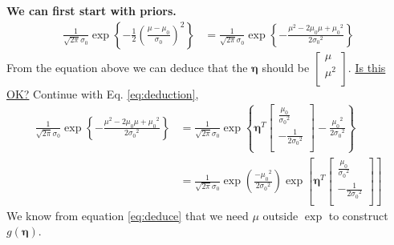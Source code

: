 \documentclass[12pt]{article}
\begin{document}
\textbf{We can first start with priors.}
\begin{equation}\label{eq:deduction}
    \begin{split}
        \frac{1}{\sqrt{2 \pi} \sigma_{0}} \exp \left\{-\frac{1}{2}\left(\frac{\mu-\mu_{0}}{\sigma_{0}}\right)^{2}\right\}&=\frac{1}{\sqrt{2 \pi} \sigma_{0}}\exp \left\{-\frac{\mu^2-2{\mu}_0\mu+{\mu_0}^2}{2{\sigma_0}^2}\right\}
    \end{split}
\end{equation}
From the equation above we can deduce that the $\boldsymbol{\eta}$ should be $
    \begin{bmatrix}
        \mu   \\
        \mu^2 \\
    \end{bmatrix}$.
\underline{Is this OK?}
Continue with Eq. \ref{eq:deduction},
\begin{equation}\label{eq:deduce}
    \begin{split}
        \frac{1}{\sqrt{2 \pi} \sigma_{0}}\exp \left\{-\frac{\mu^2-2{\mu}_0\mu+{\mu_0}^2}{2{\sigma_0}^2}\right\}&=\frac{1}{\sqrt{2 \pi} \sigma_{0}}\exp \left\{\boldsymbol{\eta}^T\begin{bmatrix}
            \frac{\mu_0}{{\sigma_0}^2} \\
            -\frac{1}{2{\sigma_0}^2}   \\
        \end{bmatrix}-\frac{{\mu_0}^2}{2{\sigma_0}^2}\right\}\\
        &=\frac{1}{\sqrt{2 \pi} \sigma_{0}}\exp{\left(\frac{-{\mu_0}^2}{2{\sigma_0}^2}\right)}\exp{\left[\boldsymbol{\eta}^T\begin{bmatrix}
                    \frac{\mu_0}{{\sigma_0}^2} \\
                    -\frac{1}{2{\sigma_0}^2}   \\
                \end{bmatrix}\right] }
    \end{split}
\end{equation}
We know from equation \ref{eq:deduce} that we need $\mu$ outside $\exp$ to construct $g(\boldsymbol{\eta})$.
\end{document}
